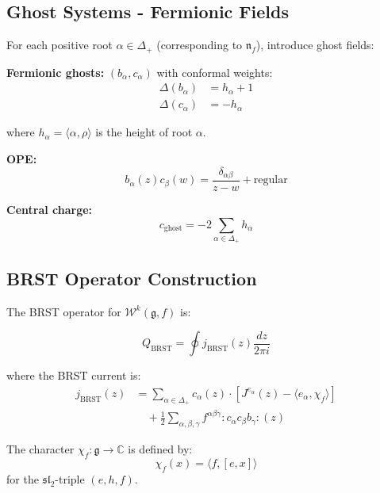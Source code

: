\subsection{Ghost Systems - Fermionic Fields}

\begin{definition}
\label{def:ghost-systems}
For each positive root $\alpha \in \Delta_+$ (corresponding to $\mathfrak{n}_f$), 
introduce ghost fields:

\textbf{Fermionic ghosts:} $(b_\alpha, c_\alpha)$ with conformal weights:
\begin{align*}
\Delta(b_\alpha) &= h_\alpha + 1 \\
\Delta(c_\alpha) &= -h_\alpha
\end{align*}

where $h_\alpha = \langle \alpha, \rho \rangle$ is the height of root $\alpha$.

\textbf{OPE:}
$$b_\alpha(z)c_\beta(w) = \frac{\delta_{\alpha\beta}}{z-w} + \text{regular}$$

\textbf{Central charge:}
$$c_{\text{ghost}} = -2\sum_{\alpha \in \Delta_+} h_\alpha$$
\end{definition}

\subsection{BRST Operator Construction}

\begin{definition}
\label{def:brst-operator-complete}
The BRST operator for $\mathcal{W}^k(\mathfrak{g}, f)$ is:

$$Q_{\text{BRST}} = \oint j_{\text{BRST}}(z) \frac{dz}{2\pi i}$$

where the BRST current is:
\begin{align}
j_{\text{BRST}}(z) &= \sum_{\alpha \in \Delta_+} c_\alpha(z) \cdot [J^{e_\alpha}(z) - 
\langle e_\alpha, \chi_f \rangle] \nonumber \\
&\quad + \frac{1}{2}\sum_{\alpha, \beta, \gamma} f^{\alpha\beta\gamma} 
:c_\alpha c_\beta b_\gamma:(z)
\end{align}

The character $\chi_f: \mathfrak{g} \to \mathbb{C}$ is defined by:
$$\chi_f(x) = \langle f, [e, x] \rangle$$
for the $\mathfrak{sl}_2$-triple $(e,h,f)$.
\end{definition}

